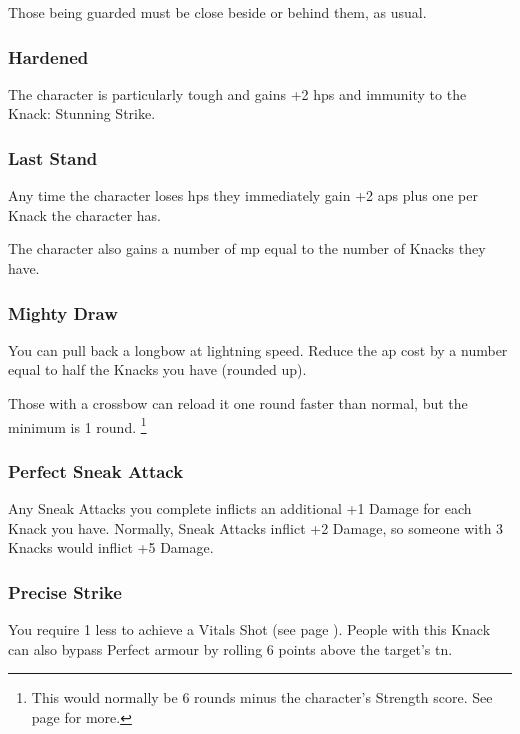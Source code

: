 \begin{multicols}{2}
Those being guarded must be close beside or behind them, as usual.

\subsubsection{Hardened}

The character is particularly tough and gains +2 \glspl{hp} and immunity to the Knack: Stunning Strike.

\subsubsection{Last Stand}

Any time the character loses \glspl{hp} they immediately gain +2 \glspl{ap} plus one per Knack the character has.

The character also gains a number of \gls{mp} equal to the number of Knacks they have.

\subsubsection{Mighty Draw}

You can pull back a longbow at lightning speed.
Reduce the \gls{ap} cost by a number equal to half the Knacks you have (rounded up).

Those with a crossbow can reload it one round faster than normal, but the minimum is 1 round.%
\footnote{This would normally be 6 rounds minus the character's Strength score. See page \pageref{crossbow} for more.}

\subsubsection{Perfect Sneak Attack}

Any Sneak Attacks you complete inflicts an additional +1 Damage for each Knack you have.
Normally, Sneak Attacks inflict +2 Damage, so someone with 3 Knacks would inflict +5 Damage.

\subsubsection{Precise Strike}\label{precisestrike}

You require 1 less to achieve a Vitals Shot (see page \pageref{vitals}).
\iftoggle{verbose}{
  For example, when targeting an opponent with a Evasion score of +2 and Partial armour, they would normally require a score of 9 to hit and a score of 12 to make a Vitals Shot which ignores all armour.
  With this Knack they still require a score of 9 to hit but only a score of 11 to make a Vitals Shot.
}{}
People with this Knack can also bypass Perfect armour by rolling 6 points above the target's \gls{tn}.


\end{multicols}
